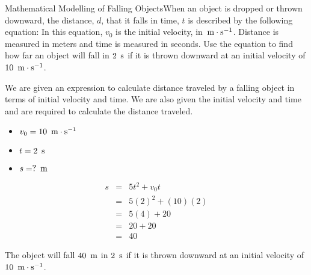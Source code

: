 \begin{wex}{Mathematical Modelling of Falling Objects}{When an object is dropped or thrown downward, the distance, $d$, that it falls in time, $t$ is described by the following equation:
In this equation, $v_0$ is the initial velocity, in $\,\mathrm{m \cdot s^{-1}}$. Distance is measured in meters and time is measured in seconds. Use the equation to find how far an object will fall in $2~\,\mathrm{s}$ if it is thrown downward at an initial velocity of $10~\,\mathrm{m \cdot s^{-1}}$.\\}
{
We are given an expression to calculate distance traveled by a falling object in terms of initial velocity and time. We are also given the initial velocity and time and are required to calculate the distance traveled.\\

\begin{itemize}
\item $v_0 = 10~\,\mathrm{m \cdot s^{-1}}$
\item $t = 2~\,\mathrm{s}$
\item $s = ?~\,\rm{m}$
\end{itemize}

\begin{eqnarray*}
s &=& 5t^2 + v_0t\\
&=&5(2)^2+(10)(2)\\
&=&5(4)+20\\
&=&20+20\\
&=&40
\end{eqnarray*}

The object will fall $40~\,\rm{m}$ in $2~\,\mathrm{s}$ if it is thrown downward at an initial velocity of $10~\,\mathrm{m \cdot s^{-1}}$.}
\end{wex}

